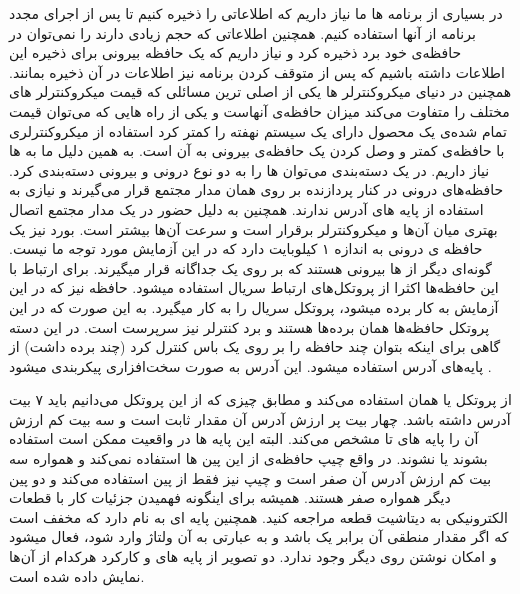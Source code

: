 در بسیاری از برنامه ها ما نیاز داریم که اطلاعاتی را ذخیره کنیم تا پس از اجرای مجدد برنامه از آنها استفاده کنیم. همچنین اطلاعاتی که حجم زیادی دارند را نمی‌توان در حافظه‌ی خود برد ذخیره کرد و نیاز داریم که یک حافظه بیرونی برای ذخیره این اطلاعات داشته باشیم که پس از متوقف کردن برنامه نیز اطلاعات در آن ذخیره بمانند. همچنین در دنیای میکروکنترلر ها یکی از اصلی ترین مسائلی که قیمت میکروکنترلر های مختلف را متفاوت می‌کند میزان حافظه‌ی آنهاست و یکی از راه هایی که می‌توان قیمت تمام شده‌ی یک محصول دارای یک سیستم نهفته را کمتر کرد استفاده از میکروکنترلری با حافظه‌ی کمتر و وصل کردن یک حافظه‌ی بیرونی به آن است.
 به همین دلیل ما به  ها نیاز داریم.
\newline
در یک دسته‌بندی می‌توان  ها را به دو نوع درونی و بیرونی دسته‌بندی کرد. حافظه‌های درونی در کنار پردازنده بر روی همان مدار مجتمع قرار می‌گیرند و نیازی به استفاده از پایه های آدرس ندارند. همچنین به دلیل حضور در یک مدار مجتمع اتصال بهتری میان آن‌ها و میکروکنترلر برقرار است و سرعت آن‌ها بیشتر است. بورد  نیز یک حافظه ی  درونی به اندازه ۱ کیلوبایت دارد که در این آزمایش مورد توجه ما نیست.
\newline
 گونه‌ای دیگر از 
 ها بیرونی هستند که بر روی یک 
 جداگانه قرار میگیرند. برای ارتباط با این حافظه‌ها اکثرا از پروتکل‌های ارتباط سریال استفاده میشود. حافظه 
 نیز که در این آزمایش به کار برده میشود، پروتکل سریال 
 را به کار میگیرد. به این صورت که در این پروتکل حافظه‌ها همان برده‌ها 
 هستند و برد کنترلر نیز سرپرست  
 است. در این دسته گاهی برای اینکه بتوان چند حافظه را بر روی یک باس کنترل کرد (چند برده داشت) از پایه‌های آدرس استفاده میشود. این آدرس به صورت سخت‌افزاری پیکربندی میشود 
 .
\newline

از پروتکل 
یا همان  استفاده می‌کند و مطابق چیزی که از این پروتکل می‌دانیم باید ۷ بیت آدرس داشته باشد. چهار بیت پر ارزش آدرس آن مقدار ثابت  است و سه بیت کم ارزش آن را پایه های
 تا 
مشخص می‌کند. البته این پایه ها در واقعیت ممکن است استفاده بشوند یا نشوند. در واقع چیپ حافظه‌ی  از این پین ها استفاده نمی‌کند و همواره سه بیت کم ارزش آدرس آن صفر است و چیپ  نیز فقط از پین  استفاده می‌کند و دو پین دیگر همواره صفر هستند. همیشه برای اینگونه فهمیدن جزئیات کار با قطعات الکترونیکی به دیتاشیت قطعه مراجعه کنید.
\newline
همچنین 
پایه ای به نام 
دارد که مخفف 
است که اگر مقدار منطقی آن برابر یک باشد و به عبارتی به آن ولتاژ وارد شود، فعال میشود و امکان نوشتن روی 
دیگر وجود ندارد.
دو تصویر از پایه های 
و کارکرد هرکدام از آن‌ها نمایش داده شده است.

